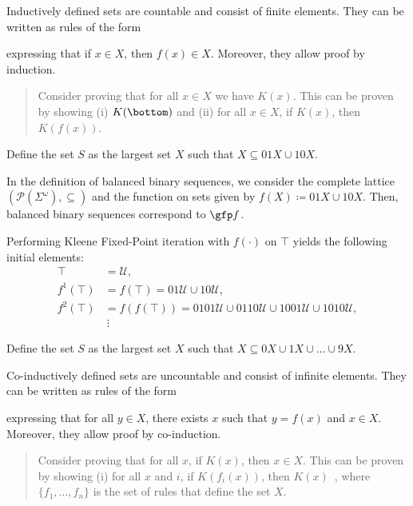 \begin{remark}
    Inductively defined sets are countable and consist of finite elements.
    They can be written as rules of the form
\begin{prooftree}
\end{prooftree}
    expressing that if $x \in X$, then $f(x) \in X$. Moreover, they allow proof by induction. 
    \begin{quote}
         Consider proving that for all $x \in X$ we have $K(x)$. This can be proven by showing (i) $K(\bottom)$ and (ii) for all $x \in X$, if $K(x)$, then $K(f(x))$.
    \end{quote}
\end{remark}

\begin{definition}
    Define the set $S$ as the largest set $X$ such that $X \subseteq 01X \cup 10X$.
\end{definition}


\begin{remark}
    In the definition of balanced binary sequences, we consider the complete lattice $(\mathcal{P}(\Sigma^\omega), \subseteq)$ and the function on sets given by $f(X) \coloneqq 01X \cup 10X$. Then, balanced binary sequences correspond to $\gfp f$.	
    
    Performing Kleene Fixed-Point iteration with $f(\cdot)$ on $\top$ yields the following initial elements:
    \begin{align*}
        \top &= \mathcal{U}, \\
        f^1(\top) &= f(\top) = 01\mathcal{U} \cup 10\mathcal{U}, \\
        f^2(\top) &= f(f(\top)) = 0101\mathcal{U} \cup 0110\mathcal{U} \cup 1001\mathcal{U} \cup 1010\mathcal{U}, \\
        &\ \vdots
    \end{align*}
\end{remark}


\begin{definition}[Interval {$[0, 1]$}]
    Define the set $S$ as the largest set $X$ such that $X \subseteq 0X \cup 1X \cup \ldots \cup 9X$.
\end{definition}


\begin{remark}
    Co-inductively defined sets are uncountable and consist of infinite elements.
    They can be written as rules of the form
    \begin{prooftree}
\end{prooftree}
   expressing that for all $y \in X$, there exists $x$ such that $y = f(x)$ and $x \in X$. Moreover, they allow proof by co-induction.
    \begin{quote}
        Consider proving that for all $x$, if $K(x)$, then $x \in X$.
		This can be proven by showing (i) for all $x$ and $i$, if $K(f_i(x))$, then $K(x)$ \,, where $\{f_1, \ldots, f_n\}$ is the set of rules that define the set $X$.
    \end{quote}
\end{remark}




